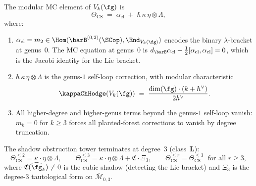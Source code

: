 \begin{theorem}
\label{thm:cs-mc-element}
The modular MC element of $V_k(\fg)$ is
\begin{equation}\label{eq:cs-mc-element}
\Theta_{\mathrm{CS}}
\;=\;
\alpha_{\mathrm{cl}}
\;+\;
\hbar\,\kappa\,\eta \otimes \Lambda,
\end{equation}
where:
\begin{enumerate}[label=\textup{(\roman*)}]
\item $\alpha_{\mathrm{cl}} = m_2 \in
 \Hom(\barB^{(0,2)}(\SCop), \End_{V_k(\fg)})$
 encodes the binary $\lambda$-bracket at genus~$0$.
 The MC equation at genus~$0$ is
 $d_{\barB}\alpha_{\mathrm{cl}}
 + \frac{1}{2}[\alpha_{\mathrm{cl}}, \alpha_{\mathrm{cl}}] = 0$,
 which is the Jacobi identity for the Lie bracket.
\item $\hbar\,\kappa\,\eta \otimes \Lambda$ is the genus-$1$
 self-loop correction, with modular characteristic
 \begin{equation}\label{eq:cs-kappa}
 \kappaChHodge(V_k(\fg))
 \;=\;
 \frac{\dim(\fg)\cdot(k + h^\vee)}{2h^\vee}.
 \end{equation}
\item All higher-degree and higher-genus terms beyond the
 genus-$1$ self-loop vanish: $m_k = 0$ for $k \ge 3$
 forces all planted-forest corrections to vanish by degree
 truncation.
\end{enumerate}
The shadow obstruction tower terminates at degree~$3$ (class~$\mathbf{L}$):
\[
\Theta_{\mathrm{CS}}^{\le 2} = \kappa \cdot \eta \otimes \Lambda,
\qquad
\Theta_{\mathrm{CS}}^{\le 3} = \kappa \cdot \eta \otimes \Lambda
+ \mathfrak{C} \cdot \Xi_3,
\qquad
\Theta_{\mathrm{CS}}^{\le r} = \Theta_{\mathrm{CS}}^{\le 3}
\;\text{ for all } r \ge 3,
\]
where $\mathfrak{C}(\widehat{\fg}_k) \ne 0$ is the cubic shadow
(detecting the Lie bracket) and $\Xi_3$ is the degree-$3$
tautological form on $\overline{\mathcal{M}}_{0,3}$.
\end{theorem}

